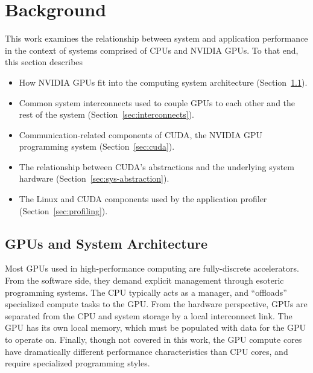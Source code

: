 \chapter{Background}
\label{ch:background}

This work examines the relationship between system and application performance in the context of systems comprised of CPUs and NVIDIA GPUs.
To that end, this section describes
\begin{itemize}
\item How NVIDIA GPUs fit into the computing system architecture (Section~\ref{sec:gpu-sys-arch}).
\item Common system interconnects used to couple GPUs to each other and the rest of the system (Section~\ref{sec:interconnects}).
\item Communication-related components of CUDA, the NVIDIA GPU programming system (Section~\ref{sec:cuda}).
\item The relationship between CUDA's abstractions and the underlying system hardware (Section~\ref{sec:sys-abstraction}).
\item The Linux and CUDA components used by the application profiler (Section~\ref{sec:profiling}).
\end{itemize}


\section{GPUs and System Architecture}
\label{sec:gpu-sys-arch}

Most GPUs used in high-performance computing are fully-discrete accelerators.
From the software side, they demand explicit management through esoteric programming systems.
The CPU typically acts as a manager,  and ``offloads'' specialized compute tasks to the GPU.
From the hardware perspective, GPUs are separated from the CPU and system storage by a local interconnect link.
The GPU has its own local memory, which must be populated with data for the GPU to operate on.
Finally, though not covered in this work, the GPU compute cores have dramatically different performance characteristics than CPU cores, and require specialized programming styles.


